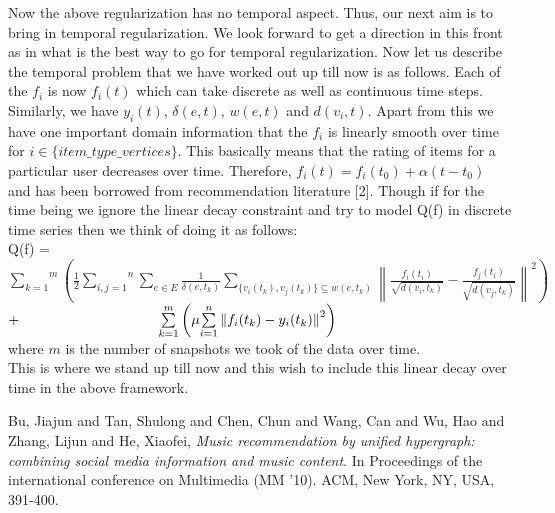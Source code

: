 \documentclass[12pt]{article}
\begin{document}
Now the above regularization has no temporal aspect. Thus, our next aim is to bring in temporal regularization. We look forward to get a direction in this front as in what is the best way to go for temporal regularization. Now let us describe the temporal problem that we have worked out up till now is as follows. Each of the \(f_{i}\) is now \(f_{i}(t)\) which can take discrete as well as continuous time steps. Similarly, we have \(y_i(t)\), \(\delta(e,t)\), \(w(e,t)\) and \(d(v_i,t)\). Apart from this we have one important domain information that the \(f_i\) is linearly smooth over time for \(i \in \{item\_type\_vertices\}\). This basically means that the rating of items for a particular user decreases over time. Therefore, \(f_i(t) = f_i(t_0) + \alpha (t-t_0)\) and has been borrowed from recommendation literature [2]. Though if for the time being we ignore the linear decay constraint and try to model Q(f) in discrete time series then we think of doing it as follows:\\

 Q(f) =   \( \overset{m}{\underset{k=1}{\sum}} \left (   \frac{1}{2} \overset{n}{\underset{i,j=1}{\sum}} \underset{e \in E}{\sum} \frac{1}{\delta(e,t_k)} \underset{ \{v_i(t_k), v_j(t_k) \}{ \subseteq w(e,t_k)}}{\sum}  \left \|  \frac{f_i(t_i)}{\sqrt{d(v_i,t_k)}} - \frac{f_j(t_i)}{\sqrt{d(v_j,t_k)}}  \right \|^{2} \right ) \) \\   \(  + \hspace{3.5cm}   \overset{m}{\underset{k=1}{\sum}} \left( \mu \overset{n}{\underset{i=1}{\sum}} \left\|f_i(t_k) - y_i(t_k)\right\|^{2} \right )   \)   \\

where \(m\) is the number of snapshots we took of the data over time.\\

This is where we stand up till now and this wish to include this linear decay over time in the above framework. 

\begin{thebibliography}{9}

  Bu, Jiajun and Tan, Shulong and Chen, Chun and Wang, Can and Wu, Hao and Zhang, Lijun and He, Xiaofei,
  \emph{Music recommendation by unified hypergraph: combining social media information and music content}.
 In Proceedings of the international conference on Multimedia (MM '10). ACM, New York, NY, USA, 391-400.

\end{thebibliography}
\end{document}
